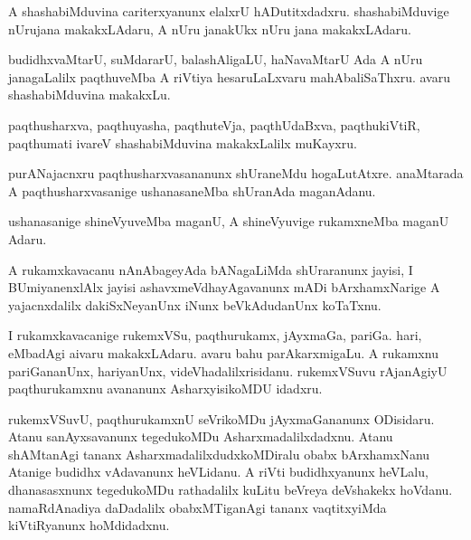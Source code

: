 \documentclass{article}
\begin{document}
\begin{mn}%
A shashabiMduvina cariterxyanunx elalxrU
hADutitxdadxru. shashabiMduvige nUrujana makakxLAdaru, A nUru janakUkx
nUru jana makakxLAdaru.
\end{mn}

\begin{mn}
budidhxvaMtarU, suMdararU, balashAligaLU, haNavaMtarU Ada A nUru
janagaLalilx paqthuveMba A riVtiya hesaruLaLxvaru
mahAbaliSaThxru. avaru shashabiMduvina makakxLu.
\end{mn}

\begin{mn}
paqthusharxva, paqthuyasha, paqthuteVja, paqthUdaBxva, paqthukiVtiR,
paqthumati ivareV shashabiMduvina makakxLalilx muKayxru.
\end{mn}

\begin{mn}
purANajacnxru paqthusharxvasananunx shUraneMdu
hogaLutAtxre. anaMtarada A paqthusharxvasanige ushanasaneMba shUranAda maganAdanu.
\end{mn}

\begin{mn}
ushanasanige shineVyuveMba maganU, A shineVyuvige rukamxneMba maganU Adaru.
\end{mn}

\begin{mn}
A rukamxkavacanu nAnAbageyAda bANagaLiMda shUraranunx jayisi, I
BUmiyanenxlAlx jayisi ashavxmeVdhayAgavanunx mADi bArxhamxNarige A
yajacnxdalilx dakiSxNeyanUnx iNunx beVkAdudanUnx koTaTxnu.
\end{mn}

\begin{mn}%
I rukamxkavacanige rukemxVSu, paqthurukamx, jAyxmaGa, pariGa. hari,
eMbadAgi aivaru makakxLAdaru. avaru bahu parAkarxmigaLu. A rukamxnu
pariGananUnx, hariyanUnx, videVhadalilxrisidanu. rukemxVSuvu
rAjanAgiyU paqthurukamxnu avananunx AsharxyisikoMDU idadxru.
\end{mn}

\begin{mn}%
rukemxVSuvU, paqthurukamxnU seVrikoMDu jAyxmaGananunx ODisidaru. Atanu
sanAyxsavanunx tegedukoMDu Asharxmadalilxdadxnu. Atanu shAMtanAgi
tananx AsharxmadalilxdudxkoMDiralu obabx bArxhamxNanu Atanige budidhx
vAdavanunx heVLidanu. A riVti budidhxyanunx heVLalu, dhanasasxnunx
tegedukoMDu rathadalilx kuLitu beVreya deVshakekx
hoVdanu. namaRdAnadiya daDadalilx obabxMTiganAgi tananx vaqtitxyiMda
kiVtiRyanunx hoMdidadxnu.
\end{mn}
\end{document}
